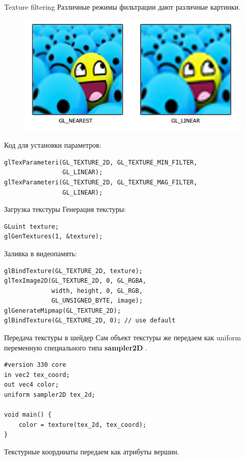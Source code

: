 \documentclass[aspectration=1610,t]{beamer}
\begin{document}
\begin{frame}[fragile]{Texture filtering}
    Различные режимы фильтрации дают различные картинки.
    \begin{figure}[htp]
        \centering
        \includegraphics[scale=0.40]{res/tex_fil}
    \end{figure}

    Код для установки параметров:
    {\small \begin{lstlisting}
glTexParameteri(GL_TEXTURE_2D, GL_TEXTURE_MIN_FILTER,
                GL_LINEAR);
glTexParameteri(GL_TEXTURE_2D, GL_TEXTURE_MAG_FILTER,
                GL_LINEAR);
    \end{lstlisting}}
\end{frame}

\begin{frame}[fragile]{Загрузка текстуры}
    Генерация текстуры:
    {\small \begin{lstlisting}
GLuint texture;
glGenTextures(1, &texture);
    \end{lstlisting}}
    Заливка в видеопамять:
    {\small \begin{lstlisting}
glBindTexture(GL_TEXTURE_2D, texture);
glTexImage2D(GL_TEXTURE_2D, 0, GL_RGBA, 
             width, height, 0, GL_RGB,
             GL_UNSIGNED_BYTE, image);
glGenerateMipmap(GL_TEXTURE_2D);
glBindTexture(GL_TEXTURE_2D, 0); // use default
    \end{lstlisting}}
\end{frame}

\begin{frame}[fragile]{Передача текстуры в шейдер}
    Сам объект текстуры же передаем как uniform переменную специального типа {\bf sampler2D }.
    {\small \begin{lstlisting}
#version 330 core
in vec2 tex_coord;
out vec4 color;
uniform sampler2D tex_2d;

void main() {
    color = texture(tex_2d, tex_coord);
}
    \end{lstlisting}}
    Текстурные координаты передаем как атрибуты вершин.
\end{frame}
\end{document}
